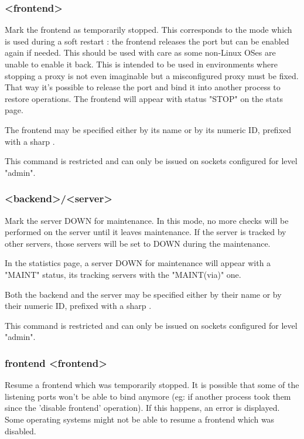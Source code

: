 \subsubsection[disable frontend]{ <frontend>}

  Mark the frontend as temporarily stopped. This corresponds to the mode which
  is used during a soft restart : the frontend releases the port but can be
  enabled again if needed. This should be used with care as some non-Linux OSes
  are unable to enable it back. This is intended to be used in environments
  where stopping a proxy is not even imaginable but a misconfigured proxy must
  be fixed. That way it's possible to release the port and bind it into another
  process to restore operations. The frontend will appear with status "STOP"
  on the stats page.

  The frontend may be specified either by its name or by its numeric ID,
  prefixed with a sharp \chr{\#}.

  This command is restricted and can only be issued on sockets configured for
  level "admin".

\subsubsection[disable server]{ <backend>/<server>}

  Mark the server DOWN for maintenance. In this mode, no more checks will be
  performed on the server until it leaves maintenance.
  If the server is tracked by other servers, those servers will be set to DOWN
  during the maintenance.

  In the statistics page, a server DOWN for maintenance will appear with a
  "MAINT" status, its tracking servers with the "MAINT(via)" one.

  Both the backend and the server may be specified either by their name or by
  their numeric ID, prefixed with a sharp \chr{\#}.

  This command is restricted and can only be issued on sockets configured for
  level "admin".

\subsubsection[enable frontend]{ frontend <frontend>}

  Resume a frontend which was temporarily stopped. It is possible that some of
  the listening ports won't be able to bind anymore (eg: if another process
  took them since the 'disable frontend' operation). If this happens, an error
  is displayed. Some operating systems might not be able to resume a frontend
  which was disabled.

